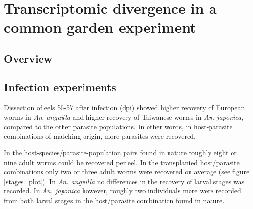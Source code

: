 
\chapter{Transcriptomic divergence in a common garden experiment}
\label{cha:tra-diff}


\ifpdf
    \graphicspath{{6_rna_seq/figures/PNG/}{6_rna_seq/figures/PDF/}{6_rna_seq/figures/}}
\else
    \graphicspath{{6_rna_seq/figures/EPS/}{6_rna_seq/figures/}}
\fi



\section{Overview}


\section{Infection experiments}

Dissection of eels 55-57 after infection (dpi) showed higher recovery
of European worms in \textit{An. anguilla} and higher recovery of
Taiwanese worms in \textit{An. japonica}, compared to the other
parasite populations. In other words, in host-parasite combinations of
matching origin, more parasites were recovered.


In the host-species/parasite-population pairs found in nature roughly
eight or nine adult worms could be recovered per eel. In the
transplanted host/parasite combinations only two or three adult worms
were recovered on average (see figure \ref{stages_plot}). In
\textit{An. anguilla} no differences in the recovery of larval stages
was recorded. In \textit{An. japonica} however, roughly two
individuals more were recorded from both larval stages in the
host/parasite combination found in nature.

